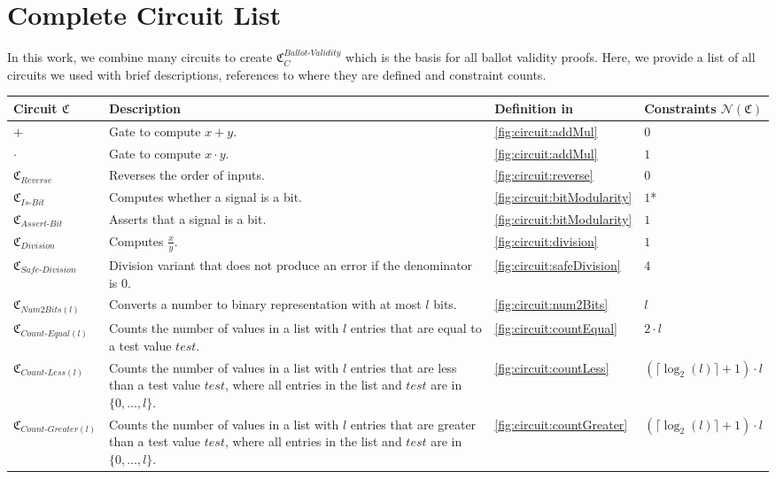 \newpage
\section{Complete Circuit List}
In this work, we combine many circuits to create $\mathfrak{C}_C^{Ballot\text{-}Validity}$ which is the basis for all ballot validity proofs.
Here, we provide a list of all circuits we used with brief descriptions, references to where they are defined and constraint counts.

\renewcommand{\arraystretch}{1.3}
\begin{longtable}{|L{4cm}|L{5.5cm}|L{1.3cm}|L{3cm}|}
    \hline
    Circuit $\mathfrak{C}$ & Description & Definition in & Constraints $\mathcal{N}(\mathfrak{C})$\\
    \hline
    \hline
    $+$ & Gate to compute $x+y$. & \cref{fig:circuit:addMul} & $0$\\
    $\cdot$ & Gate to compute $x\cdot y$. & \cref{fig:circuit:addMul} & $1$\\
    \hline
    $\mathfrak{C}_{Reverse}$ & Reverses the order of inputs. & \cref{fig:circuit:reverse} & $0$\\
    $\mathfrak{C}_{Is\text{-}Bit}$ & Computes whether a signal is a bit. & \cref{fig:circuit:bitModularity} & $1$*\\
    $\mathfrak{C}_{Assert\text{-}Bit}$ & Asserts that a signal is a bit. & \cref{fig:circuit:bitModularity} & $1$\\
    $\mathfrak{C}_{Division}$ & Computes $\frac{x}{y}$. & \cref{fig:circuit:division} & $1$\\
    $\mathfrak{C}_{Safe\text{-}Division}$ & Division variant that does not produce an error if the denominator is $0$.& \cref{fig:circuit:safeDivision} & $4$\\
    $\mathfrak{C}_{Num2Bits(l)}$ & Converts a number to binary representation with at most $l$ bits. & \cref{fig:circuit:num2Bits} & $l$\\
    $\mathfrak{C}_{Count\text{-}Equal(l)}$ & Counts the number of values in a list with $l$ entries that are equal to a test value $test$. & \cref{fig:circuit:countEqual} & $2\cdot l$\\
    $\mathfrak{C}_{Count\text{-}Less(l)}$ & Counts the number of values in a list with $l$ entries that are less than a test value $test$, where all entries in the list and $test$ are in $\{0,\dots, l\}$. & \cref{fig:circuit:countLess} & $(\lceil \log_2(l)\rceil + 1)\cdot l$\\
    $\mathfrak{C}_{Count\text{-}Greater(l)}$ & Counts the number of values in a list with $l$ entries that are greater than a test value $test$, where all entries in the list and $test$ are in $\{0,\dots, l\}$. & \cref{fig:circuit:countGreater} & $(\lceil \log_2(l)\rceil + 1)\cdot l$\\

\end{longtable}
